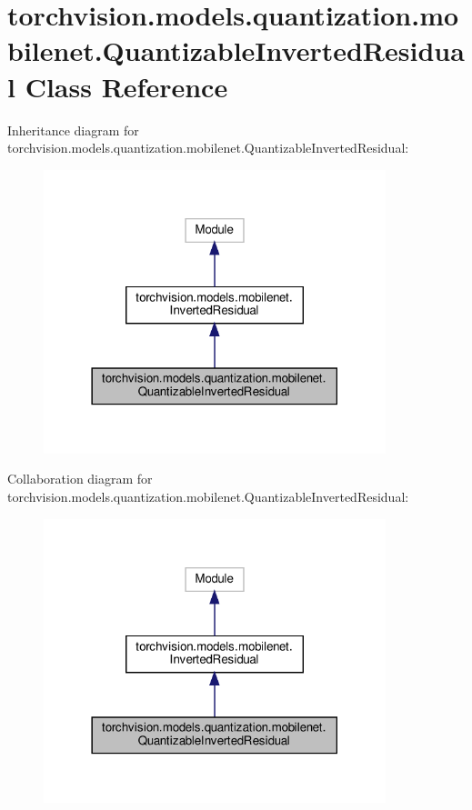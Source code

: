 \hypertarget{classtorchvision_1_1models_1_1quantization_1_1mobilenet_1_1QuantizableInvertedResidual}{}\section{torchvision.\+models.\+quantization.\+mobilenet.\+Quantizable\+Inverted\+Residual Class Reference}
\label{classtorchvision_1_1models_1_1quantization_1_1mobilenet_1_1QuantizableInvertedResidual}


Inheritance diagram for torchvision.\+models.\+quantization.\+mobilenet.\+Quantizable\+Inverted\+Residual\+:
\nopagebreak
\begin{figure}[H]
\begin{center}
\leavevmode
\includegraphics[width=282pt]{classtorchvision_1_1models_1_1quantization_1_1mobilenet_1_1QuantizableInvertedResidual__inherit__graph}
\end{center}
\end{figure}


Collaboration diagram for torchvision.\+models.\+quantization.\+mobilenet.\+Quantizable\+Inverted\+Residual\+:
\nopagebreak
\begin{figure}[H]
\begin{center}
\leavevmode
\includegraphics[width=282pt]{classtorchvision_1_1models_1_1quantization_1_1mobilenet_1_1QuantizableInvertedResidual__coll__graph}
\end{center}
\end{figure}
